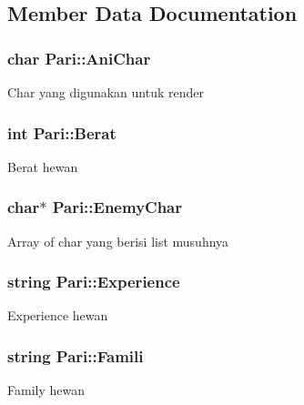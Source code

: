 \subsection{Member Data Documentation}
\subsubsection[{\texorpdfstring{Ani\+Char}{AniChar}}]{\setlength{\rightskip}{0pt plus 5cm}char Pari\+::\+Ani\+Char\hspace{0.3cm}{\ttfamily [protected]}}\hypertarget{class_pari_adc28998e9196bb80e188140f52990dd4}{}\label{class_pari_adc28998e9196bb80e188140f52990dd4}
Char yang digunakan untuk render 
\subsubsection[{\texorpdfstring{Berat}{Berat}}]{\setlength{\rightskip}{0pt plus 5cm}int Pari\+::\+Berat\hspace{0.3cm}{\ttfamily [protected]}}\hypertarget{class_pari_af09ebc3ca43824ed8ad595a5af618b1a}{}\label{class_pari_af09ebc3ca43824ed8ad595a5af618b1a}
Berat hewan 
\subsubsection[{\texorpdfstring{Enemy\+Char}{EnemyChar}}]{\setlength{\rightskip}{0pt plus 5cm}char$\ast$ Pari\+::\+Enemy\+Char\hspace{0.3cm}{\ttfamily [protected]}}\hypertarget{class_pari_a9247e9974d727eacf825e3767d79d00d}{}\label{class_pari_a9247e9974d727eacf825e3767d79d00d}
Array of char yang berisi list musuhnya 
\subsubsection[{\texorpdfstring{Experience}{Experience}}]{\setlength{\rightskip}{0pt plus 5cm}string Pari\+::\+Experience\hspace{0.3cm}{\ttfamily [protected]}}\hypertarget{class_pari_a5af7337a5d81ce05b41684caad72f693}{}\label{class_pari_a5af7337a5d81ce05b41684caad72f693}
Experience hewan 
\subsubsection[{\texorpdfstring{Famili}{Famili}}]{\setlength{\rightskip}{0pt plus 5cm}string Pari\+::\+Famili\hspace{0.3cm}{\ttfamily [protected]}}\hypertarget{class_pari_a04952b36531c2e1e11bc71765ad397ae}{}\label{class_pari_a04952b36531c2e1e11bc71765ad397ae}
Family hewan 
